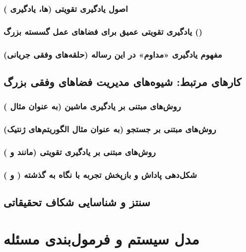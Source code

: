 \documentclass[12pt,a4paper]{report} %
\begin{document}
\subsection{اصول یادگیری تقویتی (ها، یادگیری )}
\subsection{یادگیری تقویتی عمیق برای فضاهای عمل گسسته بزرگ ()}
\subsection{مفهوم یادگیری «مداوم» در این رساله (حلقه‌های وفقی جریانی)}

\section{کار‌های مرتبط: شیوه‌های مدیریت فضاهای وفقی بزرگ}
\subsection{روش‌های مبتنی بر یادگیری ماشین (به عنوان مثال )}
\subsection{روش‌های مبتنی بر جستجو (به عنوان مثال الگوریتم‌های ژنتیک)}
\subsection{روش‌های مبتنی بر یادگیری تقویتی (مانند  و )}
\subsection{شکل‌دهی پاداش و بازپخش تجربه با نگاه به گذشته ( و )}

\section{سنتز و شناسایی شکاف تحقیقاتی}

\newpage

\chapter{مدل سیستم و فرمول‌بندی مسئله}
\end{document}
